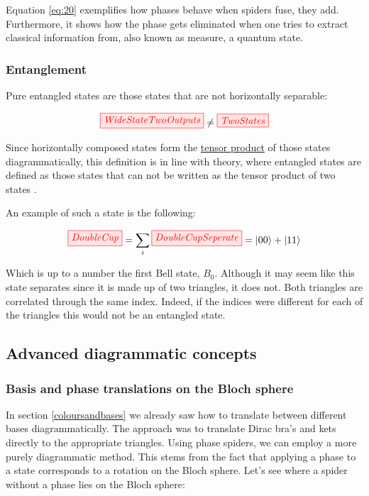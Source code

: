 \documentclass[]{article}
\begin{document}
Equation \eqref{eq:20} exemplifies how phases behave when spiders fuse, they add. Furthermore, it shows how the phase gets eliminated when one tries to extract classical information from, also known as measure, a quantum state.

\subsubsection{Entanglement}
\label{entanglement}
Pure entangled states are those states that are not horizontally separable: 

\begin{equation}
\tikzfig{WideStateTwoOutputs} \neq \tikzfig{TwoStates}
\end{equation}

Since horizontally composed states form the \hyperref[doubling]{tensor product} of those states diagrammatically, this definition is in line with theory, where entangled states are defined as those states that can not be written as the tensor product of two states \cite{nielsen2011}. 

An example of such a state is the following:

\begin{equation}
\tikzfig{DoubleCup} = \sum\limits_{i} \tikzfig{DoubleCupSeperate} = \ket{00} + \ket{11}
\end{equation}

Which is up to a number the first Bell state, $B_0$. Although it may seem like this state separates since it is made up of two triangles, it does not. Both triangles are correlated through the same index. Indeed, if the indices were different for each of the triangles this would not be an entangled state.

\subsection{Advanced diagrammatic concepts}

\subsubsection{Basis and phase translations on the Bloch sphere}

In section \ref{coloursandbases} we already saw how to translate between different bases diagrammatically. The approach was to translate Dirac bra's and kets directly to the appropriate triangles. Using phase spiders, we can employ a more purely diagrammatic method. This stems from the fact that applying a phase to a state corresponds to a rotation on the Bloch sphere. Let's see where a spider without a phase lies on the Bloch sphere:
\end{document}

